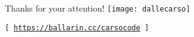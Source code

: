 \begin{frame}{Thanks for your attention!}
    \centering
    \vspace*{15px}
    \texttt{[image: dallecarso]}
    \vspace*{10px}

    \texttt{[ \href{https://ballarin.cc/carsocode}{https://ballarin.cc/carsocode} ]}
\end{frame}